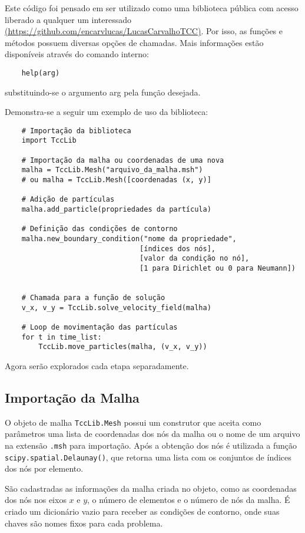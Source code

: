 Este código foi pensado em ser utilizado como uma biblioteca pública com acesso liberado a qualquer um interessado \href{https://github.com/encarvlucas/LucasCarvalhoTCC}{(https://github.com/encarvlucas/LucasCarvalhoTCC)}.
Por isso, as funções e métodos possuem diversas opções de chamadas.
Mais informações estão disponíveis através do comando interno:
\begin{verbatim}
    help(arg)
\end{verbatim}
substituindo-se o argumento arg pela função desejada.

Demonstra-se a seguir um exemplo de uso da biblioteca:
\begin{verbatim}
    # Importação da biblioteca
    import TccLib

    # Importação da malha ou coordenadas de uma nova
    malha = TccLib.Mesh("arquivo_da_malha.msh")
    # ou malha = TccLib.Mesh([coordenadas (x, y)]
    
    # Adição de partículas
    malha.add_particle(propriedades da partícula)

    # Definição das condições de contorno
    malha.new_boundary_condition("nome da propriedade",
                                [índices dos nós], 
                                [valor da condição no nó],
                                [1 para Dirichlet ou 0 para Neumann])


    # Chamada para a função de solução
    v_x, v_y = TccLib.solve_velocity_field(malha)

    # Loop de movimentação das partículas
    for t in time_list:
        TccLib.move_particles(malha, (v_x, v_y))
\end{verbatim}

Agora serão explorados cada etapa separadamente.

\subsection{\textbf{Importação da Malha}}
O objeto de malha \verb|TccLib.Mesh| possui um construtor que aceita como parâmetros uma lista de coordenadas dos nós da malha ou o nome de um arquivo na extensão \verb|.msh| para importação.
Após a obtenção dos nós é utilizada a função \verb|scipy.spatial.Delaunay()|, que retorna uma lista com os conjuntos de índices dos nós por elemento.

São cadastradas as informações da malha criada no objeto, como as coordenadas dos nós nos eixos $x$ e $y$, o número de elementos e o número de nós da malha.
É criado um dicionário vazio para receber as condições de contorno, onde suas chaves são nomes fixos para cada problema.


